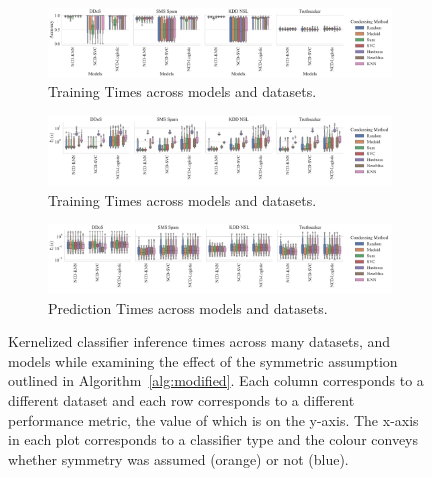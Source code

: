 \documentclass[conference]{IEEEtran}
\begin{document}
\begin{figure}[htb]
    \begin{subfigure}[htb]{\textwidth}
        \centering
        \includegraphics[width=\textwidth]{figs/combined/condensing_methods_vs_accuracy.pdf}
        \caption{Training Times across models and datasets.}
        \label{fig:condense_acc}
    \end{subfigure}
    \begin{subfigure}[htb]{\textwidth}
        \centering
        \includegraphics[width=\textwidth]{figs/combined/condensing_methods_vs_train_time.pdf}
        \caption{Training Times across models and datasets.}
        \label{fig:condense_train_time}
    \end{subfigure}
    \begin{subfigure}[htb]{\textwidth}
        \includegraphics[width=\textwidth]{figs/combined/condensing_methods_vs_predict_time.pdf}
        \caption{Prediction Times across models and datasets.}
        \label{fig:condense_pred_time}
    \end{subfigure}
    \caption{Kernelized classifier inference times across many datasets, and models while examining the effect of the symmetric assumption outlined in Algorithm~\ref{alg:modified}. Each column corresponds to a different dataset and each row corresponds to a different performance metric, the value of which is on the y-axis. The x-axis in each plot corresponds to a classifier type and the colour conveys whether symmetry was assumed (orange) or not (blue).}
    \label{fig:condense_summary}
\end{figure}
\end{document}
